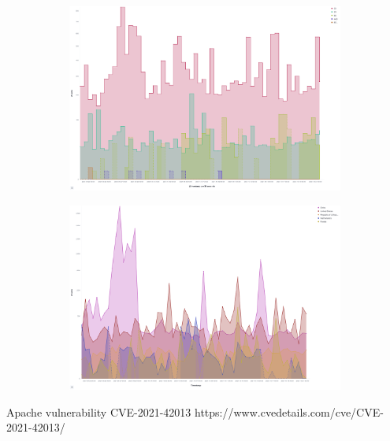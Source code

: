 \begin{figure}
    \centering
   
    \begin{subfigure}[b]{0.49\textwidth}
        \centering
        \includegraphics[width=\textwidth]{figures/tpot-cowire-attacks.png}
        \caption{}
        \label{fig:tpot-cowire-attacks}
    \end{subfigure}
    \hfill
    \begin{subfigure}[b]{0.49\textwidth}
        \centering
        \includegraphics[width=\textwidth]{figures/tpot-cowire-country.png}
        \caption{}
        \label{fig:tpot-cowire-country}
    \end{subfigure}
    \caption[]{}
    \label{fig:cowire}
\end{figure}

Apache vulnerability CVE-2021-42013 https://www.cvedetails.com/cve/CVE-2021-42013/

